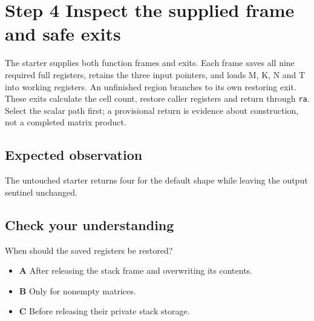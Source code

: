 \section{Step 4 Inspect the supplied frame and safe exits}\label{matmul-s04}

The starter supplies both function frames and exits. Each frame saves all nine required full registers, retains the three input pointers, and loads M, K, N and T into working registers. An unfinished region branches to its own restoring exit. These exits calculate the cell count, restore caller registers and return through \texttt{ra}. Select the scalar path first; a provisional return is evidence about construction, not a completed matrix product.

\subsection{Expected observation}
The untouched starter returns four for the default shape while leaving the output sentinel unchanged.

\subsection{Check your understanding}
When should the saved registers be restored?

\begin{itemize}
  \item \textbf{A} After releasing the stack frame and overwriting its contents.
  \item \textbf{B} Only for nonempty matrices.
  \item \textbf{C} Before releasing their private stack storage.
\end{itemize}
